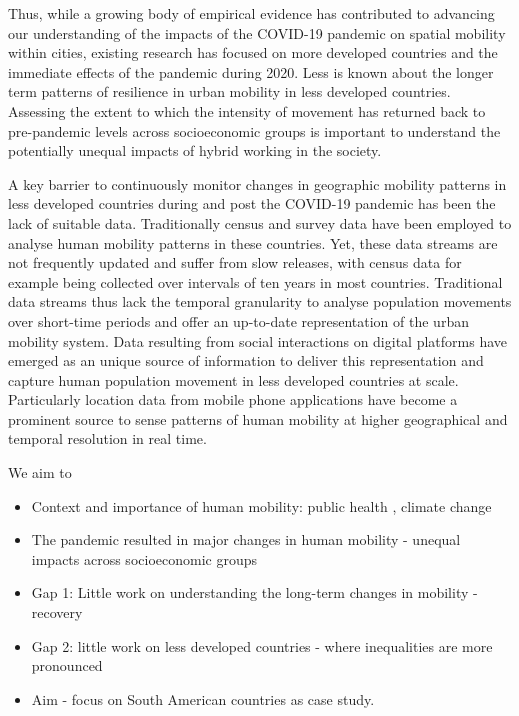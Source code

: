 \documentclass[
  11pt,
]{article}
\providecommand{\tightlist}{%
  \setlength{\itemsep}{0pt}\setlength{\parskip}{0pt}}\usepackage{longtable,booktabs,array}
\begin{document}
Thus, while a growing body of empirical evidence has contributed to
advancing our understanding of the impacts of the COVID-19 pandemic on
spatial mobility within cities, existing research has focused on more
developed countries and the immediate effects of the pandemic during
2020. Less is known about the longer term patterns of resilience in
urban mobility in less developed countries. Assessing the extent to
which the intensity of movement has returned back to pre-pandemic levels
across socioeconomic groups is important to understand the potentially
unequal impacts of hybrid working in the society.

A key barrier to continuously monitor changes in geographic mobility
patterns in less developed countries during and post the COVID-19
pandemic has been the lack of suitable data. Traditionally census and
survey data have been employed to analyse human mobility patterns in
these countries. Yet, these data streams are not frequently updated and
suffer from slow releases, with census data for example being collected
over intervals of ten years in most countries. Traditional data streams
thus lack the temporal granularity to analyse population movements over
short-time periods and offer an up-to-date representation of the urban
mobility system. Data resulting from social interactions on digital
platforms have emerged as an unique source of information to deliver
this representation and capture human population movement in less
developed countries at scale. Particularly location data from mobile
phone applications have become a prominent source to sense patterns of
human mobility at higher geographical and temporal resolution in real
time.

We aim to

\begin{itemize}
\tightlist
\item
  Context and importance of human mobility: public health , climate
  change\\
\item
  The pandemic resulted in major changes in human mobility - unequal
  impacts across socioeconomic groups\\
\item
  Gap 1: Little work on understanding the long-term changes in mobility
  - recovery\\
\item
  Gap 2: little work on less developed countries - where inequalities
  are more pronounced\\
\item
  Aim - focus on South American countries as case study.
\end{itemize}
\end{document}
